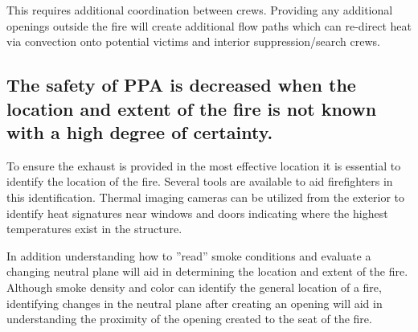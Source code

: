 \documentclass{article}
\begin{document}
This requires additional coordination between crews. Providing any additional openings outside the fire will create additional flow paths which can re-direct heat via convection onto potential victims and interior suppression/search crews. 

\subsection{The safety of PPA is decreased when the location and extent of the fire is not known with a high degree of certainty.}
To ensure the exhaust is provided in the most effective location it is essential to identify the location of the fire. Several tools are available to aid firefighters in this identification. Thermal imaging cameras can be utilized from the exterior to identify heat signatures near windows and doors indicating where the highest temperatures exist in the structure. 

In addition understanding how to ''read'' smoke conditions and evaluate a changing neutral plane will aid in determining the location and extent of the fire. Although smoke density and color can identify the general location of a fire, identifying changes in the neutral plane after creating an opening will aid in understanding the proximity of the opening created to the seat of the fire. 
\end{document}
